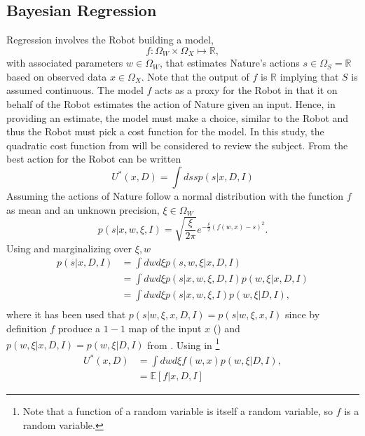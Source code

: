 \subsection{Bayesian Regression}
\label{chp:regression}
Regression involves the Robot building a model,
\begin{equation}
	f: \Omega_W\times \Omega_X\mapsto\mathbb{R},
\end{equation} 
with associated parameters $w\in \Omega_W$, that estimates Nature's actions $s\in \Omega_S=\mathbb{R}$ based on observed data $x\in \Omega_X$. Note that the output of $f$ is $\mathbb{R}$ implying that $S$ is assumed continuous. The model $f$ acts as a proxy for the Robot in that it on behalf of the Robot estimates the action of Nature given an input. Hence, in providing an estimate, the model must make a choice, similar to the Robot and thus the Robot must pick a cost function for the model. In this study, the quadratic cost function from  will be considered to review the subject. From  the best action for the Robot can be written
\begin{equation}
	U^*(x,D) = \int ds s p(s|x,D,I)
	\label{eq:q1}
\end{equation}
Assuming the actions of Nature follow a normal distribution with the function $f$ as mean and an unknown precision, $\xi\in \Omega_W$
\begin{equation}
	p(s|x,w,\xi,I)=\sqrt{\frac{\xi}{2\pi}} e^{-\frac{\xi}{2}(f(w,x)-s)^2}.
	\label{f_dist}
\end{equation}
Using  and marginalizing over $\xi,w$
\begin{equation}
	\begin{split}
		p(s|x,D,I) &= \int dw d\xi p(s,w,\xi|x,D,I)\\
		& = \int dw d\xi p(s|x,w,\xi,D,I)  p(w,\xi|x,D,I)\\
		& = \int dw d\xi p(s|x,w,\xi,I)  p(w,\xi|D,I),\\
	\end{split}
	\label{eq:q2}
\end{equation}
where it has been used that $p(s|w,\xi,x,D,I) = p(s|w,\xi,x,I)$ since by definition $f$ produce a $1-1$ map of the input $x$ () and $p(w,\xi|x,D,I) = p(w,\xi|D,I)$ from . Using  in \footnote{Note that a function of a random variable is itself a random variable, so $f$ is a random variable.}
\begin{equation}
	\begin{split}
		U^*(x,D) & = \int dw d\xi f(w,x)  p(w,\xi|D,I),\\
		& = \mathbb{E}[f|x,D,I]
	\end{split}
	\label{eq:q3}
\end{equation}	
